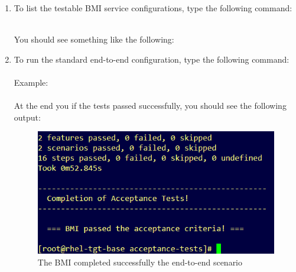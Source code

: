 \begin{enumerate}

\item  To list the testable BMI service configurations, type the following command: \\

 \\

\pagebreak

You should see something like the following:


\item To run the standard end-to-end configuration, type the following command: \\

 \\

  Example: \\

 \\


At the end you if the tests passed successfully, you should see the following output: \\

\begin{figure}[!h] %
\begin{center}
\includegraphics[scale=0.7]{figures/bdd-bmi-passed-tests.png}
\end{center}
\caption{The BMI completed successfully the end-to-end scenario}
\label{fig:bdd-bmi-example-successful}
\end{figure}


\end{enumerate}
